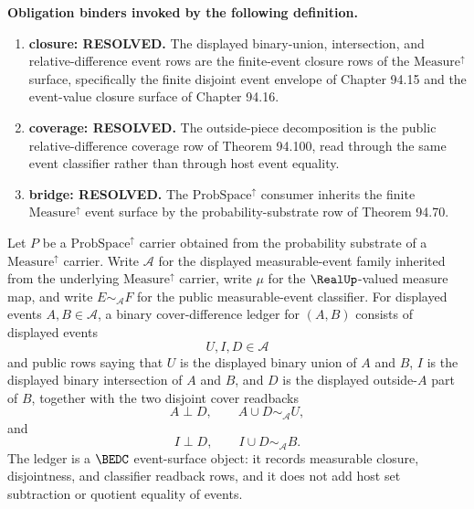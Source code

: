 \noindent\textbf{Obligation binders invoked by the following definition.}
\begin{enumerate}
\item \textbf{closure: RESOLVED.} The displayed binary-union, intersection, and relative-difference event rows are the finite-event closure rows of the $\mathrm{Measure}^{\uparrow}$ surface, specifically the finite disjoint event envelope of Chapter 94.15 and the event-value closure surface of Chapter 94.16.
\item \textbf{coverage: RESOLVED.} The outside-piece decomposition is the public relative-difference coverage row of Theorem 94.100, read through the same event classifier rather than through host event equality.
\item \textbf{bridge: RESOLVED.} The $\mathrm{ProbSpace}^{\uparrow}$ consumer inherits the finite $\mathrm{Measure}^{\uparrow}$ event surface by the probability-substrate row of Theorem 94.70.
\end{enumerate}

\begin{definition}
\label{def:probspace-binary-cover-difference-ledger}
Let $P$ be a $\mathrm{ProbSpace}^{\uparrow}$ carrier obtained from the probability substrate of a $\mathrm{Measure}^{\uparrow}$ carrier. Write $\mathcal A$ for the displayed measurable-event family inherited from the underlying $\mathrm{Measure}^{\uparrow}$ carrier, write $\mu$ for the $\RealUp$-valued measure map, and write $E \sim_{\mathcal A} F$ for the public measurable-event classifier. For displayed events $A,B \in \mathcal A$, a binary cover-difference ledger for $(A,B)$ consists of displayed events
$$
U,I,D \in \mathcal A
$$
and public rows saying that $U$ is the displayed binary union of $A$ and $B$, $I$ is the displayed binary intersection of $A$ and $B$, and $D$ is the displayed outside-$A$ part of $B$, together with the two disjoint cover readbacks
$$
A \perp D,\qquad A \cup D \sim_{\mathcal A} U,
$$
and
$$
I \perp D,\qquad I \cup D \sim_{\mathcal A} B.
$$
The ledger is a $\BEDC$ event-surface object: it records measurable closure, disjointness, and classifier readback rows, and it does not add host set subtraction or quotient equality of events.
\end{definition}

